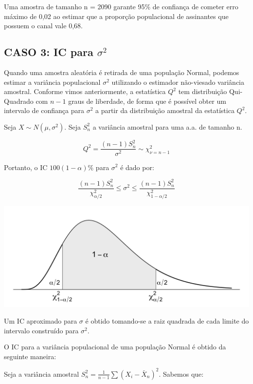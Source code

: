\documentclass[
]{book}
\theoremstyle{definition}
\theoremstyle{definition}
\theoremstyle{definition}
\theoremstyle{remark}
\begin{document}
Uma amostra de tamanho n = 2090 garante 95\% de confiança de cometer erro máximo de 0,02 ao estimar que a proporção populacional de assinantes que possuem o canal vale 0,68.

\hypertarget{caso-3-ic-para-sigma2}{%
\subsection*{\texorpdfstring{CASO 3: IC para \(\sigma^2\)}{CASO 3: IC para \textbackslash sigma\^{}2}}\label{caso-3-ic-para-sigma2}}

Quando uma amostra aleatória é retirada de uma população Normal, podemos estimar a variância populacional \(\sigma^2\) utilizando o estimador não-viesado variância amostral. Conforme vimos anteriormente, a estatística \(Q^2\) tem distribuição Qui-Quadrado com \(n-1\) graus de liberdade, de forma que é possível obter um intervalo de confiança para \(\sigma^2\) a partir da distribuição amostral da estatística \(Q^2\).

Seja
\(X \sim N(\mu, \sigma^2)\).
Seja \(S_n^2\) a variância amostral para uma a.a. de tamanho n.

\[Q^2 = \frac{(n-1)S^2_n}{\sigma^2} \sim \chi^2_{\nu=n-1}\]

Portanto, o IC \(100(1-\alpha)\%\) para \(\sigma^2\) é dado por:

\[\frac{(n-1)S^2_n}{\chi^2_{\alpha/2}} \leq \sigma^2 \leq \frac{(n-1)S^2_n}{\chi^2_{1-\alpha/2}}\]

\includegraphics[width=1\linewidth]{img/IC-var-norm}

Um IC aproximado para \(\sigma\) é obtido tomando-se a raiz quadrada de cada limite do intervalo construído para \(\sigma^2\).

O IC para a variância populacional de uma população Normal é obtido da seguinte maneira:

Seja a variância amostral \(S^2_n = \frac{1}{n-1}\sum (X_i - \bar{X}_n)^2\). Sabemos que:
\end{document}
